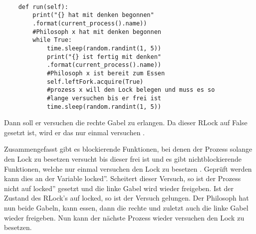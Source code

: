 \begin{lstlisting}[style = Python, label = {endloesung}, caption = {Endlösung}]

    def run(self):
        print("{} hat mit denken begonnen"
        .format(current_process().name)) 
        #Philosoph x hat mit denken begonnen
        while True:
            time.sleep(random.randint(1, 5))
            print("{} ist fertig mit denken"
            .format(current_process().name)) 
            #Philosoph x ist bereit zum Essen
            self.leftFork.acquire(True) 
            #prozess x will den Lock belegen und muss es so 
            #lange versuchen bis er frei ist
            time.sleep(random.randint(1, 5))

\end{lstlisting}

Dann soll er versuchen die rechte Gabel zu erlangen. Da dieser RLock auf False gesetzt ist, wird er das nur einmal versuchen \parencite[vgl.]{lock}.

Zusammengefasst gibt es blockierende Funktionen, bei denen der Prozess solange den Lock zu besetzen versucht bis dieser frei ist und es gibt nichtblockierende Funktionen, welche nur einmal versuchen den Lock zu besetzen \parencite[vgl.][S.164]{sturm2001}. Geprüft werden kann dies an der Variable \glqq locked''. Scheitert dieser Versuch, so ist der Prozess nicht auf \glqq locked'' gesetzt und die linke Gabel wird wieder freigeben. Ist der Zustand des RLock's auf locked, so ist der Versuch gelungen.  Der Philosoph hat nun beide Gabeln, kann essen, dann die rechte und zuletzt auch die linke Gabel wieder freigeben. Nun kann der nächste Prozess wieder versuchen den Lock zu besetzen.

